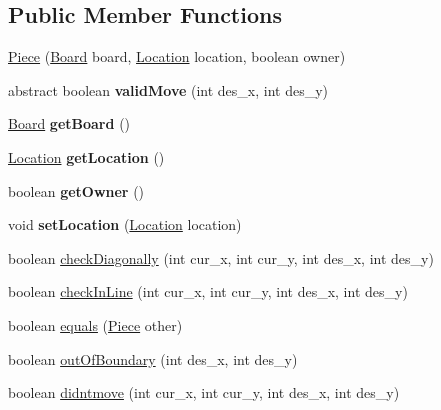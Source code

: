 \subsection*{Public Member Functions}
\begin{DoxyCompactItemize}
\item 
\hyperlink{classPieces_1_1Piece_a970bf8c665edd3574fadab1304798129}{Piece} (\hyperlink{classPieces_1_1Board}{Board} board, \hyperlink{classPieces_1_1Location}{Location} location, boolean owner)
\item 
\hypertarget{classPieces_1_1Piece_a01c050ca609d43e205923037a786823a}{abstract boolean {\bfseries valid\-Move} (int des\-\_\-x, int des\-\_\-y)}\label{classPieces_1_1Piece_a01c050ca609d43e205923037a786823a}

\item 
\hypertarget{classPieces_1_1Piece_a1163b80f94aeae277f557cdb34d23d39}{\hyperlink{classPieces_1_1Board}{Board} {\bfseries get\-Board} ()}\label{classPieces_1_1Piece_a1163b80f94aeae277f557cdb34d23d39}

\item 
\hypertarget{classPieces_1_1Piece_a402d4d6c7df72cd68415a25f2c1602e7}{\hyperlink{classPieces_1_1Location}{Location} {\bfseries get\-Location} ()}\label{classPieces_1_1Piece_a402d4d6c7df72cd68415a25f2c1602e7}

\item 
\hypertarget{classPieces_1_1Piece_ad18e2238bb732ffe521092b0dc8d12de}{boolean {\bfseries get\-Owner} ()}\label{classPieces_1_1Piece_ad18e2238bb732ffe521092b0dc8d12de}

\item 
\hypertarget{classPieces_1_1Piece_ab137d8249f1a4eb44acc4cad0826f75b}{void {\bfseries set\-Location} (\hyperlink{classPieces_1_1Location}{Location} location)}\label{classPieces_1_1Piece_ab137d8249f1a4eb44acc4cad0826f75b}

\item 
boolean \hyperlink{classPieces_1_1Piece_a5e66d12aa0a6be14976d0d6b19d4691b}{check\-Diagonally} (int cur\-\_\-x, int cur\-\_\-y, int des\-\_\-x, int des\-\_\-y)
\item 
boolean \hyperlink{classPieces_1_1Piece_a280fcf87182fd90bc66c8ee34a8107e6}{check\-In\-Line} (int cur\-\_\-x, int cur\-\_\-y, int des\-\_\-x, int des\-\_\-y)
\item 
boolean \hyperlink{classPieces_1_1Piece_af5d4a48732d86232e327c23d0b1fe1dc}{equals} (\hyperlink{classPieces_1_1Piece}{Piece} other)
\item 
boolean \hyperlink{classPieces_1_1Piece_a6f703962dfae61cd6d33c3abf36c43a1}{out\-Of\-Boundary} (int des\-\_\-x, int des\-\_\-y)
\item 
boolean \hyperlink{classPieces_1_1Piece_a61a09c26c02518e4cbb6da1389cb73d8}{didntmove} (int cur\-\_\-x, int cur\-\_\-y, int des\-\_\-x, int des\-\_\-y)
\end{DoxyCompactItemize}


